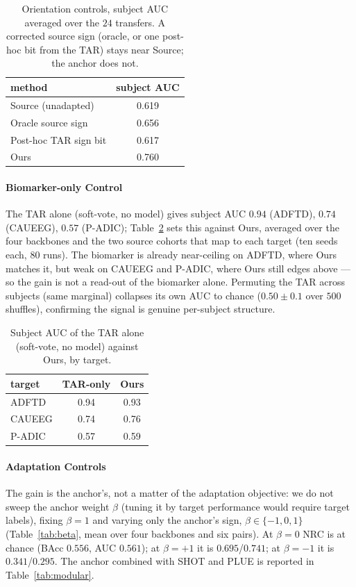 \documentclass[letterpaper]{article} %
\begin{document}
\begin{table}[h]\centering\small
\begin{tabular}{lc}
\toprule
method & subject AUC \\
\midrule
Source (unadapted)     & 0.619 \\
Oracle source sign     & 0.656 \\
Post-hoc TAR sign bit  & 0.617 \\
Ours                   & 0.760 \\
\bottomrule
\end{tabular}
\caption{Orientation controls, subject AUC averaged over the $24$ transfers. A corrected source
sign (oracle, or one post-hoc bit from the TAR) stays near Source; the anchor does not.}
\label{tab:orient}
\end{table}

\paragraph{Biomarker-only Control} The TAR alone (soft-vote, no model) gives subject AUC
$0.94$ (ADFTD), $0.74$ (CAUEEG), $0.57$ (P-ADIC); Table~\ref{tab:taronly} sets this against Ours,
averaged over the four backbones and the two source cohorts that map to each target (ten seeds each,
$80$ runs). The biomarker is already near-ceiling on ADFTD, where Ours matches it, but weak on CAUEEG
and P-ADIC, where Ours still edges above --- so the gain is not a read-out of the biomarker alone.
Permuting the TAR across subjects (same marginal) collapses its own AUC to chance ($0.50\pm0.1$ over
$500$ shuffles), confirming the signal is genuine per-subject structure.

\begin{table}[h]\centering\small
\begin{tabular}{lcc}
\toprule
target & TAR-only & Ours \\
\midrule
ADFTD  & 0.94 & 0.93 \\
CAUEEG & 0.74 & 0.76 \\
P-ADIC & 0.57 & 0.59 \\
\bottomrule
\end{tabular}
\caption{Subject AUC of the TAR alone (soft-vote, no model) against Ours, by target.}
\label{tab:taronly}
\end{table}

\paragraph{Adaptation Controls} The gain is the anchor's, not a matter of the adaptation objective:
we do not sweep the anchor weight $\beta$ (tuning it by target performance would require target
labels), fixing $\beta{=}1$ and varying only the anchor's sign, $\beta\in\{-1,0,1\}$
(Table~\ref{tab:beta}, mean over four backbones and six pairs). At $\beta{=}0$ NRC is at chance
(BAcc $0.556$, AUC $0.561$); at $\beta{=}{+}1$ it is $0.695$/$0.741$; at $\beta{=}{-}1$ it is
$0.341$/$0.295$. The anchor combined with SHOT and PLUE is reported in Table~\ref{tab:modular}.
\end{document}
